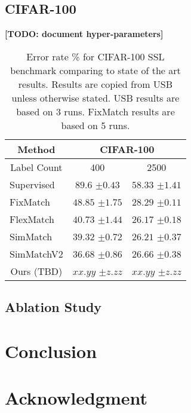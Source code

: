 \documentclass[10pt,twocolumn,letterpaper]{article}
\newcommand{\TODO}[1]{\textbf{\color{red}[TODO: #1]}}
\begin{document}

\subsection{CIFAR-100}

\TODO {document hyper-parameters}


\begin{table}[htbp]
	\begin{tabular}{c|cc}
		\multicolumn{1}{c|}{Method}            & \multicolumn{2}{c}{CIFAR-100} \\ \hline
		\multicolumn{1}{c|}{Label Count}           & 400           & 2500          \\
		\multicolumn{1}{l|}{Supervised}   & $89.6$ \scriptsize{$\pm0.43$}    & $58.33$ \scriptsize{$\pm1.41$}   \\ \hline
		\multicolumn{1}{l|}{FixMatch}      & $48.85$ \scriptsize{$\pm1.75$}   & $28.29$ \scriptsize{$\pm0.11$}   \\
		\multicolumn{1}{l|}{FlexMatch}   & $40.73$ \scriptsize{$\pm1.44$}   & $26.17$ \scriptsize{$\pm0.18$}   \\
		\multicolumn{1}{l|}{SimMatch}    & $39.32$ \scriptsize{$\pm0.72$}   & $26.21$ \scriptsize{$\pm0.37$}   \\
		\multicolumn{1}{l|}{SimMatchV2}    & $36.68$ \scriptsize{$\pm0.86$}   & $26.66$ \scriptsize{$\pm0.38$}   \\ \hline
		Ours (TBD)                            & $xx.yy$ \scriptsize{$\pm z.zz$}           & $xx.yy$ \scriptsize{$\pm z.zz$}  
	\end{tabular}
	\caption{Error rate \% for CIFAR-100 SSL benchmark comparing to state of the art results. Results are copied from USB \cite{wang2022usb} unless otherwise stated. USB results are based on 3 runs. FixMatch \cite{sohn2020fixmatch} results are based on 5 runs.}
	\label{table3}
\end{table}

\subsection{Ablation Study}





\section{Conclusion}


\section{Acknowledgment}


{
	\small
	
	
}
\end{document}
